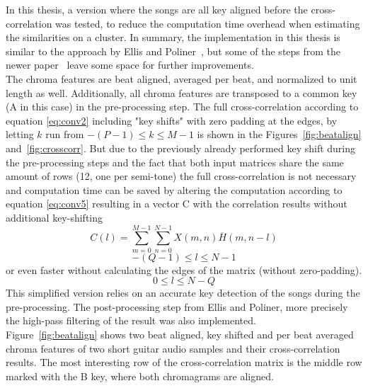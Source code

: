 In this thesis, a version where the songs are all key aligned before the cross-correlation was tested, to reduce the computation time overhead when estimating the similarities on a cluster. 
In summary, the implementation in this thesis is similar to the approach by Ellis and Poliner~\cite{chroma3}, but some of the steps from the newer paper~\cite{cover802} leave some space for further improvements.\\ The chroma features are beat aligned, averaged per beat, and normalized to unit length as well. Additionally, all chroma features are transposed to a common key (A in this case) in the pre-processing step. The full cross-correlation according to equation \eqref{eq:conv2} including "key shifts" with zero padding at the edges, by letting $k$ run from $-(P - 1) \leq k \leq M - 1$ is shown in the Figures~\ref{fig:beatalign} and~\ref{fig:crosscorr}. But due to the previously already performed key shift during the pre-processing steps and the fact that both input matrices share the same amount of rows (12, one per semi-tone) the full cross-correlation is not necessary and computation time can be saved by altering the computation according to equation \eqref{eq:conv5} resulting in a vector C with the correlation results without additional key-shifting
\begin{equation} \label{eq:conv5}
C(l) = \sum_{m = 0}^{M - 1}{\sum_{n = 0}^{N - 1}{X(m, n)\overline{H}(m, n - l)}}
\end{equation}
\begin{equation} \label{eq:conv6}
-(Q - 1) \leq l \leq N - 1
\end{equation}
or even faster without calculating the edges of the matrix (without zero-padding).
\begin{equation} \label{eq:conv7}
0 \leq l \leq N - Q
\end{equation}
\noindent This simplified version relies on an accurate key detection of the songs during the pre-processing. The post-processing step from Ellis and Poliner, more precisely the high-pass filtering of the result was also implemented.\\
Figure~\ref{fig:beatalign} shows two beat aligned, key shifted and per beat averaged chroma features of two short guitar audio samples and their cross-correlation results. The most interesting row of the cross-correlation matrix is the middle row marked with the B key, where both chromagrams are aligned. %
